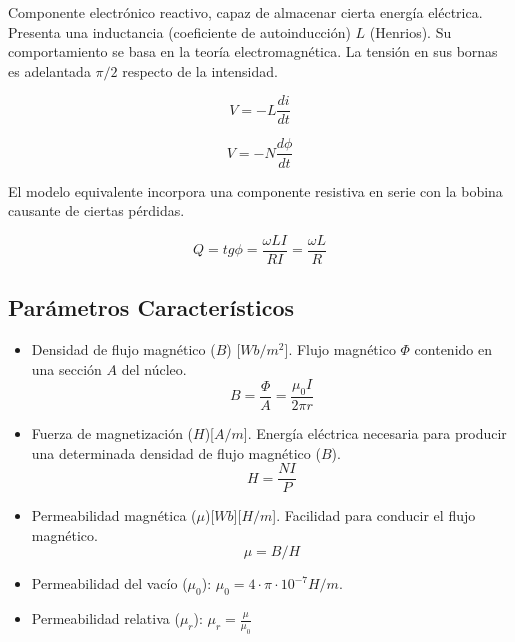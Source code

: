 Componente electrónico reactivo, capaz de almacenar cierta energía eléctrica. Presenta una inductancia (coeficiente de autoinducción) $L$ (Henrios). Su comportamiento se basa en la teoría electromagnética. La tensión en sus bornas es adelantada $\pi / 2$ respecto de la intensidad.

\begin{equation}
    V = -L \frac{di}{dt}
\end{equation}

\begin{equation}
    V = -N \frac{d\phi}{dt}
\end{equation}

El modelo equivalente incorpora una componente resistiva en serie con la bobina causante de ciertas pérdidas.

\begin{equation}
Q = tg \phi = \frac{\omega L I}{RI} = \frac{\omega L}{R}
\end{equation}

\subsection{Parámetros Característicos}

\begin{itemize}
    \item Densidad de flujo magnético ($B$) [$Wb/m^2$]. Flujo magnético $\Phi$ contenido en una sección $A$ del núcleo.
    \begin{equation}
        B = \frac{\Phi}{A} = \frac{\mu_0 I}{2\pi r}
    \end{equation}
    \item Fuerza de magnetización ($H$)[$A/m$]. Energía eléctrica necesaria para producir una determinada densidad de flujo magnético ($B$).
    \begin{equation}
        H = \frac{NI}{P}
    \end{equation}
    \item Permeabilidad magnética ($\mu$)[$Wb$][$H/m$]. Facilidad para conducir el flujo magnético. 
    \begin{equation}
        \mu = B/H
    \end{equation}
    \item Permeabilidad del vacío ($\mu_0$): $\mu_0 = 4 \cdot \pi \cdot 10^{-7} H/m$.
    \item Permeabilidad relativa ($\mu_r$): $\mu_r = \frac{\mu}{\mu_0}$
\end{itemize}



